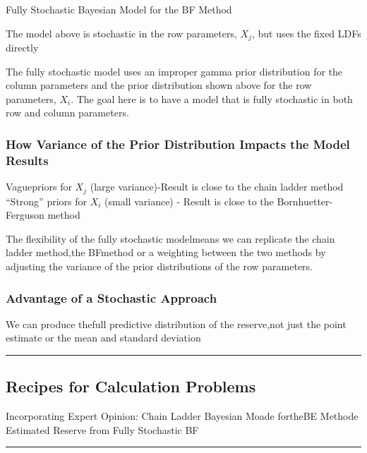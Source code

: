 \documentclass[
]{article}
\begin{document}
Fully Stochastic Bayesian Model for the BF Method

The model above is stochastic in the row parameters, \(X_{j}\), but uses
the fixed LDFs directly

The fully stochastic model uses an improper gamma prior distribution for
the column parameters and the prior distribution shown above for the row
parameters, \(X_{i}.\) The goal here is to have a model that is fully
stochastic in both row and column parameters.

\subsubsection{How Variance of the Prior Distribution Impacts the Model
Results}\label{how-variance-of-the-prior-distribution-impacts-the-model-results}

Vaguepriors for \(X_{j}\) (large variance)-Result is close to the chain
ladder method ``Strong'' priors for \(X_{i}\) (small variance) - Result
is close to the Bornhuetter-Ferguson method

The flexibility of the fully stochastic modelmeans we can replicate the
chain ladder method,the BFmethod or a weighting between the two methods
by adjusting the variance of the prior distributions of the row
parameters.

\subsubsection{Advantage of a Stochastic
Approach}\label{advantage-of-a-stochastic-approach}

We can produce thefull predictive distribution of the reserve,not just
the point estimate or the mean and standard deviation

\begin{center}\rule{0.5\linewidth}{0.5pt}\end{center}

\subsection{Recipes for Calculation
Problems}\label{recipes-for-calculation-problems-11}

Incorporating Expert Opinion: Chain Ladder Bayesian Moade fortheBE
Methode Estimated Reserve from Fully Stochastic BF

\begin{center}\rule{0.5\linewidth}{0.5pt}\end{center}
\end{document}
